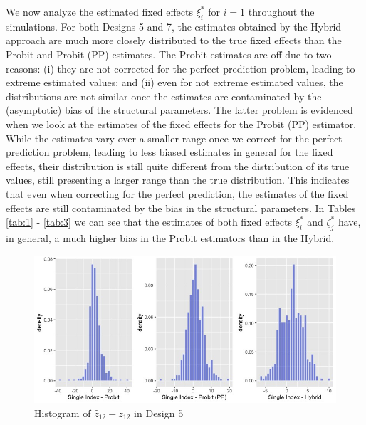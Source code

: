 We now analyze the estimated fixed effects $\xi_i^*$ for $i=1$ throughout the simulations. For both Designs 5 and 7, the estimates obtained by the Hybrid approach are much more closely distributed to the true fixed effects than the Probit and Probit (PP) estimates. The Probit estimates are off due to two reasons: (i) they are not corrected for the perfect prediction problem, leading to extreme estimated values; and (ii) even for not extreme estimated values, the distributions are not similar once the estimates are contaminated by the (asymptotic) bias of the structural parameters. The latter problem is evidenced when we look at the estimates of the fixed effects for the Probit (PP) estimator. While the estimates vary over a smaller range once we correct for the perfect prediction problem, leading to less biased estimates in general for the fixed effects, their distribution is still quite different from the distribution of its true values, still presenting a larger range than the true distribution. This indicates that even when correcting for the perfect prediction, the estimates of the fixed effects are still contaminated by the bias in the structural parameters. In Tables \ref{tab:1} - \ref{tab:3} we can see that the estimates of both fixed effects $\xi_i^*$ and $\zeta_j^*$ have, in general, a much higher bias in the Probit estimators than in the Hybrid.
\begin{figure}[htbp]
  \centerline{\includegraphics[scale=.4]{content/Figures/Hist_Zij_Design5.png}}
  \caption{\footnotesize{Histogram of $\hat{z}_{12} - z_{12}$ in Design 5}}
  \label{Hist_Zij_Design5}
\end{figure}
